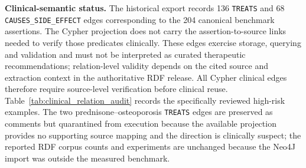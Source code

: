 \documentclass[10pt,a4paper]{article}
\begin{document}
\textbf{Clinical-semantic status.} The historical export records 136 \texttt{TREATS} and 68 \texttt{CAUSES\_SIDE\_EFFECT} edges corresponding to the 204 canonical benchmark assertions. The Cypher projection does not carry the assertion-to-source links needed to verify those predicates clinically. These edges exercise storage, querying and validation and must not be interpreted as curated therapeutic recommendations; relation-level validity depends on the cited source and extraction context in the authoritative RDF release. All Cypher clinical edges therefore require source-level verification before clinical reuse. Table~\ref{tab:clinical_relation_audit} records the specifically reviewed high-risk examples. The two prednisone--osteoporosis \texttt{TREATS} edges are preserved as comments but quarantined from execution because the available projection provides no supporting source mapping and the direction is clinically suspect; the reported RDF corpus counts and experiments are unchanged because the Neo4J import was outside the measured benchmark.
\end{document}
